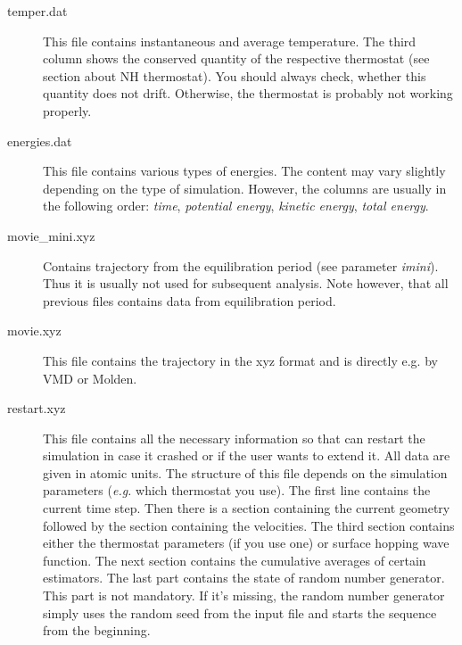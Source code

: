 \begin{description}
\item[temper.dat] This file contains instantaneous and average temperature. The third column shows the conserved quantity of the respective thermostat (see section about NH thermostat). You should always check, whether this quantity does not drift. Otherwise, the thermostat
is probably not working properly.

\item[energies.dat] This file contains various types of energies. The content may vary slightly depending on the type of simulation. However, the columns are usually in the following order: \textit{time}, \textit{potential energy}, \textit{kinetic energy}, \textit{total energy}.

\item[movie\_mini.xyz]  Contains trajectory from the equilibration period (see parameter \textit{imini}). Thus it is usually not used for subsequent analysis. Note however, that all previous files contains data from equilibration period.

\item[movie.xyz] This file contains the trajectory in the xyz format and is directly e.g. by VMD or Molden.

\item[restart.xyz] This file contains all the necessary information so that \abin can restart the simulation in case it crashed or if the user wants to extend it. All data are given in atomic units. The structure of this file depends on the simulation parameters (\textit{e.g.} which thermostat you use). The first line contains the current time step. Then there is a section containing the current geometry followed by the section containing the velocities. The third section contains either the thermostat parameters (if you use one) or surface hopping wave function. The next section contains the cumulative averages of certain estimators. The last part contains the state of random number generator. This part is not mandatory. If it's missing, the random number generator simply uses the random seed from the input file and starts the sequence from the beginning.


\end{description}

